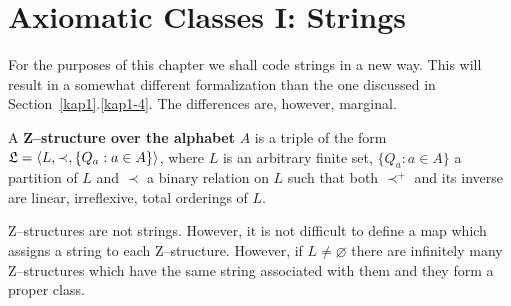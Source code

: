 \section{Axiomatic Classes I: Strings}
\label{kap5-2}
%
%
%
For the purposes of this chapter we shall code strings in a new
way. This will result in a somewhat different formalization than 
the one discussed in Section~\ref{kap1}.\ref{kap1-4}. The differences are, 
however, marginal.
\nocite{ebbinghausflum:finite}
\begin{defn}
A \textbf{Z--structure over the alphabet} $A$ is a triple of the
form $\mathfrak{L} = \langle L, \prec, \{Q_a : a \in A\}\rangle$, where $L$ is 
an arbitrary finite set, $\{Q_a : a \in A\}$ a partition of $L$ 
and $\prec$ a binary relation on $L$ such that both $\prec^+$ 
and its inverse are linear, irreflexive, total orderings of 
$L$.
\end{defn}
Z--structures are not strings. However, it is not difficult to 
define a map which assigns a string to each Z--structure. However,
if $L \neq \varnothing$ there are infinitely many Z--structures 
which have the same string associated with them and they form 
a proper class.

